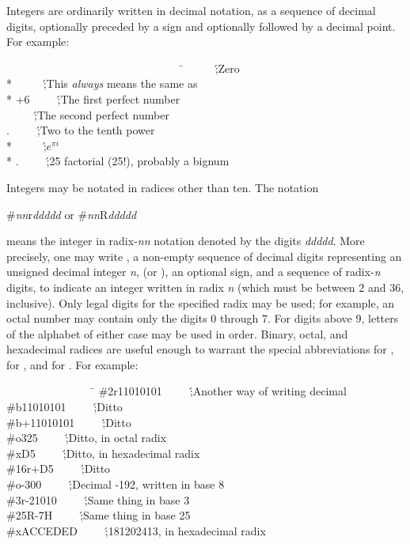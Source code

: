 Integers are ordinarily written in decimal notation, as a sequence
of decimal digits, optionally preceded by a sign and optionally followed
by a decimal point.
For example:
\begin{lisp}
~~~~~~~~~~~~~~~~~~~~~~~~~~~~~~~~\=\kill
{}~~~~~\';\textrm{Zero} \\*
~~~~~\';\textrm{This \emph{always} means the same as } \\*
\>+6~~~~~\';\textrm{The first perfect number} \\
~~~~~\';\textrm{The second perfect number} \\
.~~~~~\';\textrm{Two to the tenth power} \\*
~~~~~\';\textrm{$e^{\pi i}$} \\*
.~~~~~\';\textrm{25 factorial (25!), probably a bignum}
\end{lisp}

Integers may be notated in radices other than ten.
The notation
\begin{lisp}
\#\emph{nn}r\emph{ddddd}     \textrm{or}     \#\emph{nn}R\emph{ddddd}
\end{lisp}
means the integer in radix-\emph{nn} notation denoted by the digits
\emph{ddddd}.  More precisely, one may write \cd{\#}, a non-empty sequence
of decimal digits representing an unsigned decimal integer \emph{n},
 (or ), an optional sign, and a sequence of radix-\emph{n}
digits, to indicate an integer written in radix \emph{n} (which must be
between 2 and 36, inclusive).  Only legal digits
for the specified radix may be used; for example, an octal number may
contain only the digits 0 through 7.  For digits above 9,
letters of the alphabet of either
case may be used in order.  Binary, octal, and
hexadecimal radices are useful enough to warrant the special
abbreviations  for ,  for , and
 for .
For example:
\begin{lisp}
~~~~~~~~~~~~~~~~\=\kill
\>\#2r11010101~~~~~\';\textrm{Another way of writing  decimal} \\
\>\#b11010101~~~~~\';\textrm{Ditto} \\
\>\#b+11010101~~~~~\';\textrm{Ditto} \\
\>\#o325~~~~~\';\textrm{Ditto, in octal radix} \\
\>\#xD5~~~~~\';\textrm{Ditto, in hexadecimal radix} \\
\>\#16r+D5~~~~~\';\textrm{Ditto} \\
\>\#o-300~~~~~\';\textrm{Decimal -192, written in base 8} \\
\>\#3r-21010~~~~~\';\textrm{Same thing in base 3} \\
\>\#25R-7H~~~~~\';\textrm{Same thing in base 25} \\
\>\#xACCEDED~~~~~\';\textrm{181202413, in hexadecimal radix}
\end{lisp}

